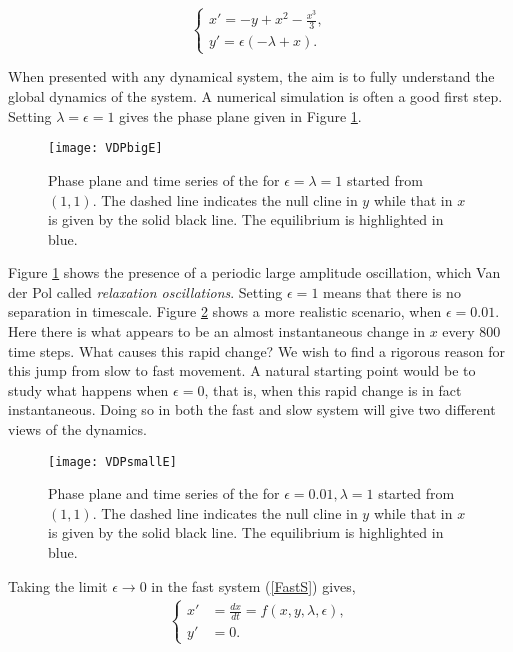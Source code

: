 \begin{equation}
\begin{cases}
x'=-y+x^2-\frac{x^3}{3}, \\
y'=\epsilon(-\lambda+x).
\end{cases}
\label{eq: canonical}
\end{equation}

When presented with any dynamical system, the aim is to fully understand the global dynamics of the system. A numerical simulation is often a good first step. Setting $\lambda=\epsilon=1$ gives the phase plane given in Figure \ref{fig:VDPE1}.
\begin{figure}[]
	\texttt{[image: VDPbigE]}
	\caption[Van der Pol Dynamics with \texorpdfstring{$\epsilon=1$}{eps=1}]{Phase plane and time series of the \vdp for $\epsilon=\lambda=1$ started from $(1,1)$. The dashed line indicates the null cline in $y$ while that in $x$ is given by the solid black line. The equilibrium is highlighted in blue.}
	\label{fig:VDPE1}
\end{figure}
Figure \ref{fig:VDPE1} shows the presence of a  periodic large amplitude oscillation, which Van der Pol called \emph{relaxation oscillations}. Setting $\epsilon=1$ means that there is no separation in timescale. Figure \ref{fig:VDPE01} shows a more realistic scenario, when $\epsilon=0.01$. Here there is what appears to be an almost instantaneous change in $x$ every 800 time steps. What causes this rapid change? We wish to find a rigorous reason for this jump from slow to fast movement. A natural starting point would be to study what happens when $\epsilon=0$, that is, when this rapid change is in fact instantaneous. Doing so in both the fast and slow system will give two different views of the dynamics.
\begin{figure}[]
	\texttt{[image: VDPsmallE]}
	\caption[Van der Pol Dynamics with \texorpdfstring{$\epsilon=0.01$}{eps=0.1}]{Phase plane and time series of the \vdp for $\epsilon=0.01, \lambda=1$ started from $(1,1)$. The dashed line indicates the null cline in $y$ while that in $x$ is given by the solid black line. The equilibrium is highlighted in blue.}
	\label{fig:VDPE01}
\end{figure}
 Taking the limit $\epsilon \to 0$ in the fast system (\ref{FastS}) gives, \begin{align} \label{FastS0}
		\begin{cases}
			x' &=\frac{dx}{dt}= f(x,y,\lambda, \epsilon),\\
			y' &= 0.
		\end{cases}
	\end{align}

